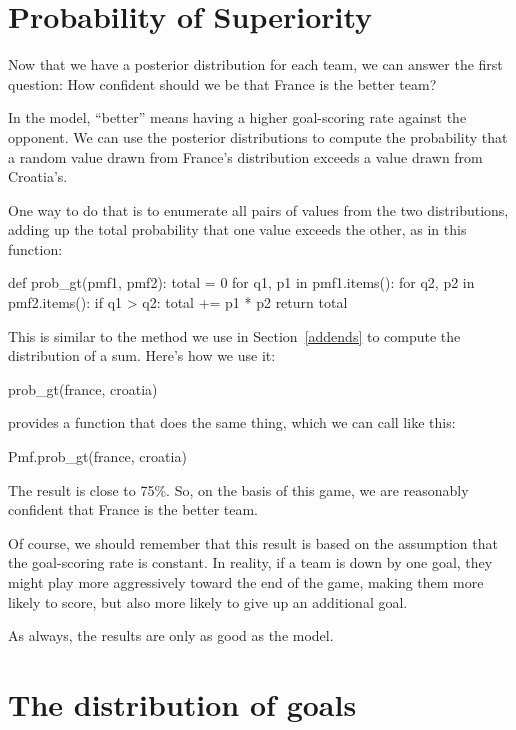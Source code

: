 \documentclass[12pt]{book}
\theoremstyle{exercise}
\begin{document}
\section{Probability of Superiority}

Now that we have a posterior distribution for each team, we can answer the first question: How confident should we be that France is the better team?

In the model, ``better'' means having a higher goal-scoring rate against the opponent.  
We can use the posterior distributions to compute the probability that a random value drawn from France's distribution exceeds a value drawn from Croatia's.

One way to do that is to enumerate all pairs of values from the two distributions, adding up the total probability that one value exceeds the other, as in this function:

\begin{code}
def prob_gt(pmf1, pmf2):
    total = 0
    for q1, p1 in pmf1.items():
        for q2, p2 in pmf2.items():
            if q1 > q2:
                total += p1 * p2
    return total
\end{code}

This is similar to the method we use in Section~\ref{addends} to compute the distribution of a sum.
Here's how we use it:

\begin{code}
prob_gt(france, croatia)
\end{code}

 provides a function that does the same thing, which we can call like this:

\begin{code}
Pmf.prob_gt(france, croatia)
\end{code}

The result is close to 75\%.  So, on the basis of this game, we are reasonably confident that France is the better team.

Of course, we should remember that this result is based on the assumption that the goal-scoring rate is constant.
In reality, if a team is down by one goal, they might play more aggressively toward the end of the game, making them more likely to score, but also more likely to give up an additional goal.

As always, the results are only as good as the model.


\section{The distribution of goals}
\end{document}
